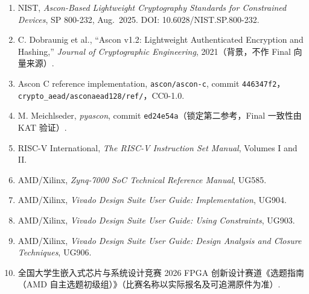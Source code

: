 
\begin{enumerate}
\def\labelenumi{\arabic{enumi}.}
\tightlist
\item
  NIST, \emph{Ascon-Based Lightweight Cryptography Standards for Constrained Devices}, SP 800-232, Aug.~2025. DOI: 10.6028/NIST.SP.800-232.
\item
  C. Dobraunig et al., ``Ascon v1.2: Lightweight Authenticated Encryption and Hashing,'' \emph{Journal of Cryptographic Engineering}, 2021（背景，不作 Final 向量来源）.
\item
  Ascon C reference implementation, \texttt{ascon/\allowbreak{}ascon-\allowbreak{}c}, commit \texttt{446347f2}，\texttt{crypto\_\allowbreak{}aead/\allowbreak{}asconaead128/\allowbreak{}ref/\allowbreak{}}，CC0-1.0.
\item
  M. Meichlseder, \emph{pyascon}, commit \texttt{ed24e54a}（锁定第二参考，Final 一致性由 KAT 验证）.
\item
  RISC-V International, \emph{The RISC-V Instruction Set Manual}, Volumes I and II.
\item
  AMD/Xilinx, \emph{Zynq-7000 SoC Technical Reference Manual}, UG585.
\item
  AMD/Xilinx, \emph{Vivado Design Suite User Guide: Implementation}, UG904.
\item
  AMD/Xilinx, \emph{Vivado Design Suite User Guide: Using Constraints}, UG903.
\item
  AMD/Xilinx, \emph{Vivado Design Suite User Guide: Design Analysis and Closure Techniques}, UG906.
\item
  全国大学生嵌入式芯片与系统设计竞赛 2026 FPGA 创新设计赛道《选题指南（AMD 自主选题初级组）》（比赛名称以实际报名及可追溯原件为准）.
\end{enumerate}
